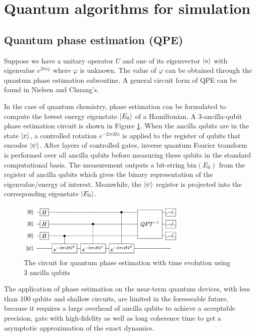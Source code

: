 \documentclass[journal=jctcce,manuscript=article]{achemso}
\begin{document}
\section{Quantum algorithms for simulation}

\subsection{Quantum phase estimation (QPE)}
\label{2.1qpe}
Suppose we have a unitary operator $U$ and one of its eigenvector $\ket{u}$ with eigenvalue $e^{2 \pi i \varphi}$ where $\varphi$ is unknown. The value of $\varphi$ can be obtained through the quantum phase estimation subroutine. A general circuit form of QPE can be found in Nielsen and Chuang's.\cite{Chuang:vn} 

In the case of quantum chemistry, phase estimation can be formulated to compute the lowest energy eigenstate $\ket{E_0}$ of a Hamiltonian.\cite{AspuruGuzik:dj} A 3-ancilla-qubit phase estimation circuit is shown in Figure \ref{qpe-cir}. When the ancilla qubits are in the state $\ket{x}$, a controlled rotation $e^{-2\pi i H x}$ is applied to the register of qubits that encodes $\ket{\psi}$. After layers of controlled gates, inverse quantum Fourier transform is performed over all ancilla qubits before measuring these qubits in the standard computational basis. The measurement outputs a bit-string $\mathrm{bin}(E_0)$ from the register of ancilla qubits which gives the binary representation of the eigenvalue/energy of interest. Meanwhile, the $\ket{\psi}$ register is projected into the corresponding eigenstate $\ket{E_0}$.

\begin{figure}[h!]
\centering
\includegraphics[width=3.25in]{qpe.jpg}
\caption{The circuit for quantum phase estimation with time evolution using 3 ancilla qubits}
\label{qpe-cir}
\end{figure}

The application of phase estimation on the near-term quantum devices, with less than 100 qubits and shallow circuits, are limited in the foreseeable future, because it requires a large overhead of ancilla qubits to achieve a acceptable precision, gate with high-fidelity as well as long coherence time to get a asymptotic approximation of the exact dynamics. 
\end{document}
